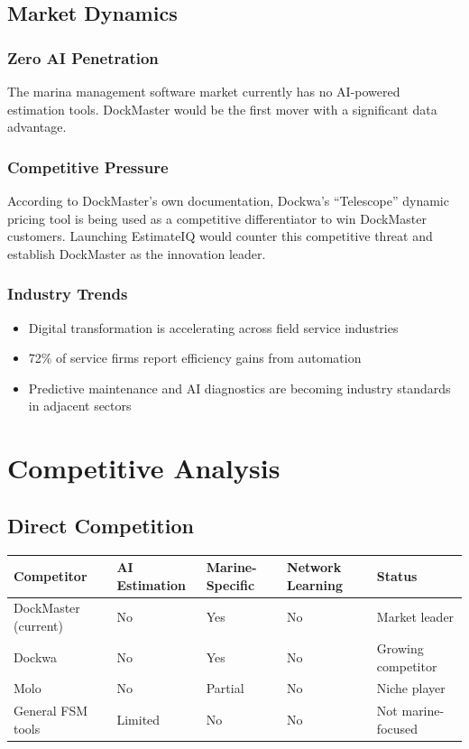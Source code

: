 \documentclass[11pt,a4paper]{article}
\begin{document}
\subsection{Market Dynamics}

\subsubsection*{Zero AI Penetration}
The marina management software market currently has no AI-powered estimation tools. DockMaster would be the first mover with a significant data advantage.

\subsubsection*{Competitive Pressure}
According to DockMaster's own documentation, Dockwa's ``Telescope'' dynamic pricing tool is being used as a competitive differentiator to win DockMaster customers. Launching EstimateIQ would counter this competitive threat and establish DockMaster as the innovation leader.

\subsubsection*{Industry Trends}
\begin{itemize}[leftmargin=*]
    \item Digital transformation is accelerating across field service industries
    \item 72\% of service firms report efficiency gains from automation
    \item Predictive maintenance and AI diagnostics are becoming industry standards in adjacent sectors
\end{itemize}

\newpage
\section{Competitive Analysis}

\subsection{Direct Competition}

\begin{table}[H]
\centering
\small
\begin{tabularx}{\textwidth}{@{}L{3cm}C{2.5cm}C{2.5cm}C{2.5cm}C{2.5cm}@{}}
\toprule
\textbf{Competitor} & \textbf{AI Estimation} & \textbf{Marine-Specific} & \textbf{Network Learning} & \textbf{Status} \\
\midrule
DockMaster (current) & No & Yes & No & Market leader \\
Dockwa & No & Yes & No & Growing competitor \\
Molo & No & Partial & No & Niche player \\
General FSM tools & Limited & No & No & Not marine-focused \\
\bottomrule
\end{tabularx}
\end{table}
\end{document}

